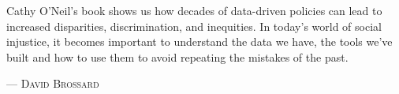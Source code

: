 Cathy O'Neil's book shows us how decades of data-driven policies can lead to increased disparities, discrimination, and inequities. In today's world of social injustice, it becomes important to understand the data we have, the tools we've built and how to use them to avoid repeating the mistakes of the past.
\setlength{\parindent}{0cm}\par\textsc{ --- David Brossard }\par\vspace{12pt}\setlength{\parindent}{15pt}
